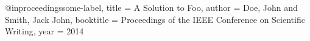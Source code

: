 @inproceedings{some-label,
  title     = {{A} {S}olution to {F}oo},
  author    = {Doe, John and Smith, Jack John},
  booktitle = {Proceedings of the IEEE Conference on Scientific Writing},
  year      = {2014}
}
